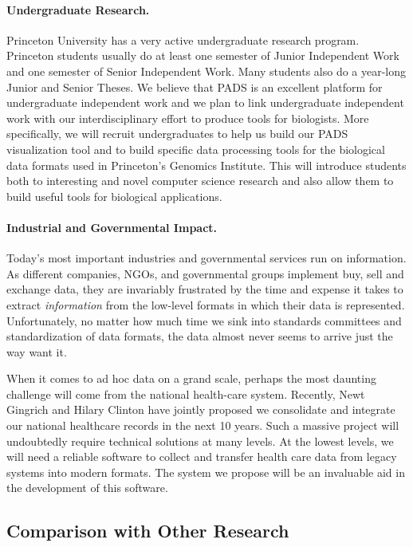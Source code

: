\documentclass[11pt]{article}
\begin{document}
\paragraph*{Undergraduate Research.}
Princeton University has a very active undergraduate research program.
Princeton students usually do at least one semester of
Junior Independent Work and one semester of Senior Independent Work. 
Many students also do a year-long
Junior and Senior Theses.  We believe that PADS is an excellent
platform for undergraduate independent work and we plan to link
undergraduate independent work with our interdisciplinary effort to
produce tools for biologists.
More specifically, we will recruit undergraduates to help us
build our PADS visualization tool and to build
specific data processing tools for the biological data formats
used in Princeton's Genomics Institute.
This will introduce students both to interesting and novel
computer science research and also allow them to build useful
tools for biological applications. 

\paragraph*{Industrial and Governmental Impact.}
Today's most important industries and governmental services
run on information.  As different companies, NGOs,
and governmental groups implement buy, sell
and exchange data, they are invariably frustrated by the time and expense
it takes to extract {\em information} from the low-level
formats in which their data is represented.  
Unfortunately, no matter how much time we sink into standards committees
and standardization of data formats, the data almost never seems to
arrive just the way want it.

When it comes to ad hoc data on a grand scale,
perhaps the most daunting challenge will come from the national
health-care system.  Recently, Newt Gingrich and Hilary Clinton have
jointly proposed we consolidate and integrate our national healthcare
records in the next 10 years.  Such a massive project will undoubtedly
require technical solutions at many levels.  At the lowest levels, we
will need a reliable software to collect and transfer health care data
from legacy systems into modern formats.  The \datatype{} system we
propose will be an invaluable aid in the development of this software.

\subsection{Comparison with Other Research}
\label{sec:related}
\end{document}
